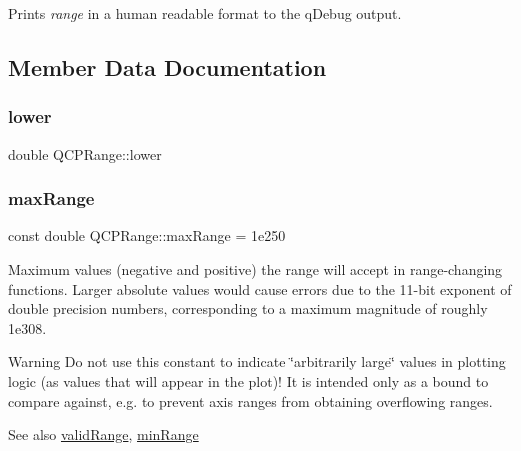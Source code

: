 Prints {\itshape range} in a human readable format to the q\+Debug output. 

\subsection{Member Data Documentation}
\mbox{\label{class_q_c_p_range_aa3aca3edb14f7ca0c85d912647b91745}} 
\subsubsection{\texorpdfstring{lower}{lower}}
{\footnotesize\ttfamily double Q\+C\+P\+Range\+::lower}

\mbox{\label{class_q_c_p_range_a5ca51e7a2dc5dc0d49527ab171fe1f4f}} 
\subsubsection{\texorpdfstring{max\+Range}{maxRange}}
{\footnotesize\ttfamily const double Q\+C\+P\+Range\+::max\+Range = 1e250\hspace{0.3cm}{\ttfamily [static]}}

Maximum values (negative and positive) the range will accept in range-\/changing functions. Larger absolute values would cause errors due to the 11-\/bit exponent of double precision numbers, corresponding to a maximum magnitude of roughly 1e308.

\begin{DoxyWarning}{Warning}
Do not use this constant to indicate \char`\"{}arbitrarily large\char`\"{} values in plotting logic (as values that will appear in the plot)! It is intended only as a bound to compare against, e.\+g. to prevent axis ranges from obtaining overflowing ranges.
\end{DoxyWarning}
\begin{DoxySeeAlso}{See also}
\hyperlink{class_q_c_p_range_ab38bd4841c77c7bb86c9eea0f142dcc0}{valid\+Range}, \hyperlink{class_q_c_p_range_ab46d3bc95030ee25efda41b89e2b616b}{min\+Range} 
\end{DoxySeeAlso}
\mbox{\label{class_q_c_p_range_ab46d3bc95030ee25efda41b89e2b616b}} 
